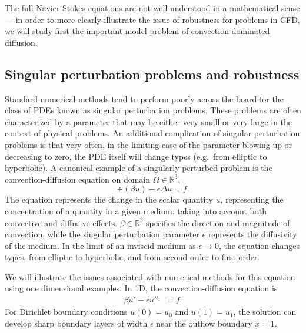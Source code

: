 The full Navier-Stokes equations are not well understood in a mathematical sense --- in order to more clearly illustrate the issue of robustness for problems in CFD, we will study first the important model problem of convection-dominated diffusion.  

\subsection{Singular perturbation problems and robustness}


Standard numerical methods tend to perform poorly across the board for the class of PDEs known as singular perturbation problems. These problems are often characterized by a parameter that may be either very small or very large in the context of physical problems.  An additional complication of singular perturbation problems is that very often, in the limiting case of the parameter blowing up or decreasing to zero, the PDE itself will change types (e.g.\ from elliptic to hyperbolic).  A canonical example of a singularly perturbed problem is the convection-diffusion equation on domain $\Omega \in \mathbb{R}^3$,
\[
\div \left(\beta u\right) - \epsilon \Delta u = f.
\]
The equation represents the change in the scalar quantity $u$, representing the concentration of a quantity in a given medium, taking into account both convective and diffusive effects. $\beta \in \mathbb{R}^3$ specifies the direction and magnitude of convection, while the singular perturbation parameter $\epsilon$ represents the diffusivity of the medium. In the limit of an inviscid medium as $\epsilon\rightarrow 0$, the equation changes types, from elliptic to hyperbolic, and from second order to first order.

We will illustrate the issues associated with numerical methods for this equation using one dimensional examples.  In 1D, the convection-diffusion equation is
\begin{align*}
\beta u'-\epsilon u'' &= f.
\end{align*}
For Dirichlet boundary conditions $u(0)=u_0$ and $u(1)= u_1$, the solution can develop sharp boundary layers of width $\epsilon$ near the outflow boundary $x=1$. 

